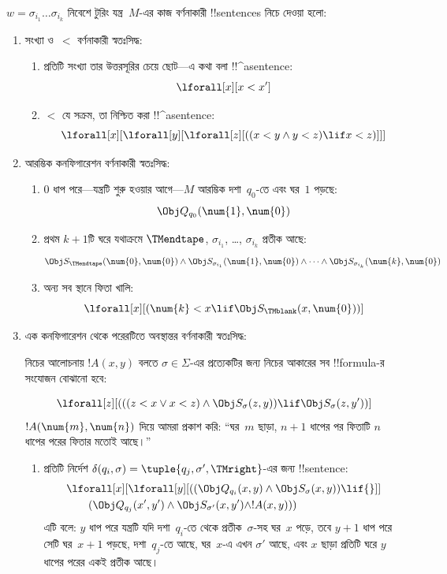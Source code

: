 \documentclass[../../../include/open-logic-section]{subfiles}
\begin{document}
$w=\sigma_{i_1}\dots\sigma_{i_k}$ নিবেশে টুরিং যন্ত্র~$M$-এর কাজ
বর্ণনাকারী !!{sentence}s নিচে দেওয়া হলো:
\begin{enumerate}
\item সংখ্যা ও~$<$ বর্ণনাকারী স্বতঃসিদ্ধ:
\begin{enumerate}
\item প্রতিটি সংখ্যা তার উত্তরসূরির চেয়ে ছোট—এ কথা বলা !!^a{sentence}:
\[
\lforall[x][x < x']
\]
\item $<$ যে সক্রম, তা নিশ্চিত করা !!^a{sentence}:
\[
\lforall[x][\lforall[y][\lforall[z][
      ((x < y \land y < z) \lif x < z)]]]
\]
\end{enumerate}
\item আরম্ভিক কনফিগারেশন বর্ণনাকারী স্বতঃসিদ্ধ:
\begin{enumerate}
\item $0$ ধাপ পরে—যন্ত্রটি শুরু হওয়ার আগে—$M$ আরম্ভিক দশা~$q_0$-তে এবং
  ঘর~$1$ পড়ছে:
\[
\Obj Q_{q_0}(\num{1}, \num{0})
\]
\item প্রথম $k+1$টি ঘরে যথাক্রমে $\TMendtape$,
  $\sigma_{i_1}$, \dots, $\sigma_{i_k}$ প্রতীক আছে:
\[
\Obj S_\TMendtape(\num{0}, \num{0}) \land
\Obj S_{\sigma_{i_1}}(\num{1}, \num{0}) \land
\dots \land
\Obj S_{\sigma_{i_k}}(\num{k}, \num{0})
\]
\item অন্য সব স্থানে ফিতা খালি:
\[
\lforall[x][(\num{k} < x \lif \Obj S_\TMblank(x, \num{0}))]
\]
\end{enumerate}
\item এক কনফিগারেশন থেকে পরেরটিতে অবস্থান্তর বর্ণনাকারী স্বতঃসিদ্ধ:

নিচের আলোচনায় $!A(x,y)$ বলতে $\sigma\in\Sigma$-এর প্রত্যেকটির জন্য
নিচের আকারের সব !!{formula}-র সংযোজন বোঝানো হবে:

\[
\lforall[z][
  (((z < x \lor x < z) \land \Obj S_\sigma(z, y))
  \lif \Obj S_\sigma(z, y'))]
\]
$!A(\num{m},\num{n})$ দিয়ে আমরা প্রকাশ করি: “ঘর~$m$ ছাড়া, $n+1$ ধাপের
পর ফিতাটি $n$ ধাপের পরের ফিতার মতোই আছে।”
\begin{enumerate}
\item {} প্রতিটি নির্দেশ
$\delta(q_i,\sigma)=\tuple{q_j,\sigma',\TMright}$-এর জন্য !!{sentence}:
\begin{align*}
& \lforall[x][\lforall[y][(
   (\Obj Q_{q_i}(x, y) \land \Obj S_{\sigma}(x, y)) \lif {}]] \\
&\qquad   (\Obj Q_{q_j}(x', y') \land \Obj S_{\sigma'}(x, y') \land
!A(x, y)))
\end{align*}
এটি বলে: $y$ ধাপ পরে যন্ত্রটি যদি দশা~$q_i$-তে থেকে প্রতীক~$\sigma$-সহ
ঘর~$x$ পড়ে, তবে $y+1$ ধাপ পরে সেটি ঘর~$x+1$ পড়ছে, দশা~$q_j$-তে আছে,
ঘর~$x$-এ এখন $\sigma'$ আছে, এবং $x$ ছাড়া প্রতিটি ঘরে $y$ ধাপের পরের
একই প্রতীক আছে।


\end{enumerate}
\end{enumerate}
\end{document}
